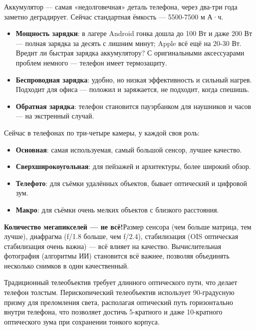 Аккумулятор — самая «недолговечная» деталь телефона, через два-три года заметно деградирует. Сейчас стандартная ёмкость — 5500-7500 м А·ч.

\begin{itemize}
  \item \textbf{Мощность зарядки}: в лагере Android гонка дошла до 100 Вт и даже 200 Вт — полная зарядка за десять с лишним минут; Apple всё ещё на 20-30 Вт. Вредит ли быстрая зарядка аккумулятору? С оригинальными аксессуарами проблем немного — телефон имеет термозащиту.
  \item \textbf{Беспроводная зарядка}: удобно, но низкая эффективность и сильный нагрев. Подходит для офиса — положил и заряжается, не подходит, когда спешишь.
  \item \textbf{Обратная зарядка}: телефон становится пауэрбанком для наушников и часов — на экстренный случай.
\end{itemize}


Сейчас в телефонах по три-четыре камеры, у каждой своя роль:

\begin{itemize}
  \item \textbf{Основная}: самая используемая, самый большой сенсор, лучшее качество.
  \item \textbf{Сверхширокоугольная}: для пейзажей и архитектуры, более широкий обзор.
  \item \textbf{Телефото}: для съёмки удалённых объектов, бывает оптический и цифровой зум.
  \item \textbf{Макро}: для съёмки очень мелких объектов с близкого расстояния.
\end{itemize}

\textbf{Количество мегапикселей — не всё!}Размер сенсора (чем больше матрица, тем лучше), диафрагма (f/1.8 больше, чем f/2.4), стабилизация (OIS оптическая стабилизация очень важна) — всё влияет на качество. Вычислительная фотография (алгоритмы ИИ) становится всё важнее, позволяя объединять несколько снимков в один качественный.


Традиционный телеобъектив требует длинного оптического пути, что делает телефон толстым. Перископический телеобъектив использует 90-градусную призму для преломления света, располагая оптический путь горизонтально внутри телефона, что позволяет достичь 5-кратного и даже 10-кратного оптического зума при сохранении тонкого корпуса.

